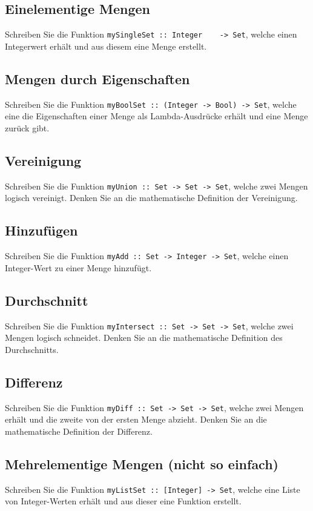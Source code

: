 \documentclass[
  10pt,                   %
  DIV12,
  german,                 %
  oneside,                %
  parskip=half,           %
  headings=normal,        %
  captions=tableheading,  %
]{scrartcl}
\begin{document}
\subsection{Einelementige Mengen}
Schreiben Sie die Funktion \lstinline|mySingleSet :: Integer    -> Set|, welche einen 
Integerwert erhält und aus diesem eine Menge erstellt. 

\subsection{Mengen durch Eigenschaften}
Schreiben Sie die Funktion \lstinline|myBoolSet :: (Integer -> Bool) -> Set|, welche eine 
die Eigenschaften einer Menge als Lambda-Ausdrücke erhält und eine Menge zurück gibt.

\subsection{Vereinigung}
Schreiben Sie die Funktion \lstinline|myUnion :: Set -> Set -> Set|, welche zwei Mengen
logisch vereinigt. Denken Sie an die mathematische Definition der Vereinigung.

\subsection{Hinzufügen}
Schreiben Sie die Funktion \lstinline|myAdd :: Set -> Integer -> Set|, welche einen Integer-Wert 
zu einer Menge hinzufügt.

\subsection{Durchschnitt}
Schreiben Sie die Funktion \lstinline|myIntersect :: Set -> Set -> Set|, welche zwei Mengen
logisch schneidet. Denken Sie an die mathematische Definition des Durchschnitts.

\subsection{Differenz}
Schreiben Sie die Funktion \lstinline|myDiff :: Set -> Set -> Set|, welche zwei Mengen
erhält und die zweite von der ersten Menge abzieht. Denken Sie an die mathematische Definition der Differenz.

\subsection{Mehrelementige Mengen (nicht so einfach)}
Schreiben Sie die Funktion \lstinline|myListSet :: [Integer] -> Set|, welche eine Liste von Integer-Werten erhält und 
aus dieser eine Funktion erstellt. 
\end{document}
